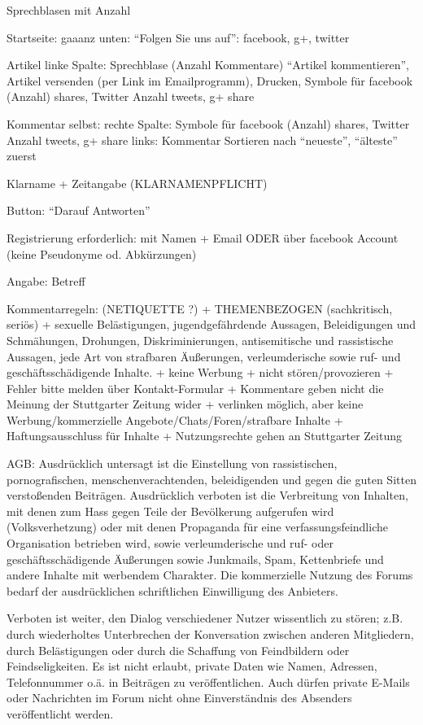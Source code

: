 Sprechblasen mit Anzahl

Startseite: 
gaaanz unten: ``Folgen Sie uns auf'': facebook, g+, twitter

Artikel linke Spalte: 
Sprechblase (Anzahl Kommentare) ``Artikel kommentieren'', Artikel versenden (per Link im Emailprogramm), Drucken, Symbole für facebook  (Anzahl) shares, Twitter Anzahl tweets, g+ share

Kommentar selbst: 
rechte Spalte: Symbole für facebook  (Anzahl) shares, Twitter Anzahl tweets, g+ share
links: Kommentar
Sortieren nach ``neueste'', ``älteste'' zuerst

Klarname + Zeitangabe (KLARNAMENPFLICHT)

Button: ``Darauf Antworten''

Registrierung erforderlich: mit Namen + Email  ODER über facebook Account (keine Pseudonyme od. Abkürzungen)

Angabe: Betreff

Kommentarregeln: (NETIQUETTE ?)
+ THEMENBEZOGEN (sachkritisch, seriös)
+ sexuelle Belästigungen, jugendgefährdende Aussagen, Beleidigungen und Schmähungen, Drohungen, Diskriminierungen, antisemitische und rassistische Aussagen, jede Art von strafbaren Äußerungen, verleumderische sowie ruf- und geschäftsschädigende Inhalte.
+ keine Werbung
+ nicht stören/provozieren
+ Fehler bitte melden über Kontakt-Formular
+ Kommentare geben nicht die Meinung der Stuttgarter Zeitung wider
+ verlinken möglich, aber keine Werbung/kommerzielle Angebote/Chats/Foren/strafbare Inhalte
+ Haftungsausschluss für Inhalte 
+ Nutzungsrechte gehen an Stuttgarter Zeitung


AGB:
Ausdrücklich untersagt ist die Einstellung von rassistischen, pornografischen, menschenverachtenden, beleidigenden und gegen die guten Sitten verstoßenden Beiträgen. Ausdrücklich verboten ist die Verbreitung von Inhalten, mit denen zum Hass gegen Teile der Bevölkerung aufgerufen wird (Volksverhetzung) oder mit denen Propaganda für eine verfassungsfeindliche Organisation betrieben wird, sowie verleumderische und ruf- oder geschäftsschädigende Äußerungen sowie Junkmails, Spam, Kettenbriefe und andere Inhalte mit werbendem Charakter. Die kommerzielle Nutzung des Forums bedarf der ausdrücklichen schriftlichen Einwilligung des Anbieters.

Verboten ist weiter, den Dialog verschiedener Nutzer wissentlich zu stören; z.B. durch wiederholtes Unterbrechen der Konversation zwischen anderen Mitgliedern, durch Belästigungen oder durch die Schaffung von Feindbildern oder Feindseligkeiten. Es ist nicht erlaubt, private Daten wie Namen, Adressen, Telefonnummer o.ä. in Beiträgen zu veröffentlichen. Auch dürfen private E-Mails oder Nachrichten im Forum nicht ohne Einverständnis des Absenders veröffentlicht werden.


